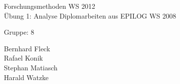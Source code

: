 
\begin{titlepage}
\sffamily

{ \Large Forschungsmethoden WS 2012} \\[3cm]
    
{ \Large Übung 1: Analyse Diplomarbeiten aus EPILOG WS 2008 \\[2cm] }

\vfill

{ \large
Gruppe: 8 \\[2cm] }

Bernhard Fleck \\
Rafael Konik \\
Stephan Matiasch \\
Harald Watzke \\

\end{titlepage}
